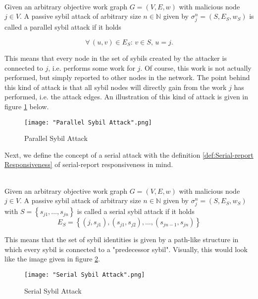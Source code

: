 \begin{definition}\ \\
\label{def:Parallel Sybil Attack}
Given an arbitrary objective work graph $G=(V,E,w)$ with malicious node $j\in{}V$. A passive sybil attack of arbitrary size $n\in\mathbb{N}$ given by $\sigma^n_j=(S,E_S,w_S)$ is called a parallel sybil attack if it holds 

\[
\forall\,(u,v)\in{}E_S:\,v\in{}S,\,u=j .
\]

\noindent{}This means that every node in the set of sybils created by the attacker is connected to $j$, i.e. performs some work for $j$. Of course, this work is not actually performed, but simply reported to other nodes in the network. The point behind this kind of attack is that all sybil nodes will directly gain from the work $j$ has performed, i.e. the attack edges. An illustration of this kind of attack is given in figure \ref{fig:Parallel Sybil Attack} below. \vspace{1em}\\


\begin{figure}[H]
\begin{center}
\texttt{[image: "Parallel Sybil Attack".png]}
\caption{Parallel Sybil Attack}
\label{fig:Parallel Sybil Attack}
\end{center}
\end{figure}

\end{definition}


\noindent{}Next, we define the concept of a serial attack with the definition \ref{def:Serial-report Responsiveness} of serial-report responsiveness in mind. \vspace{1em}\\

\begin{definition}\ \\
\label{def:Serial Sybil Attack}
Given an arbitrary objective work graph $G=(V,E,w)$ with malicious node $j\in{}V$. A passive sybil attack of arbitrary size $n\in\mathbb{N}$ given by $\sigma^n_j=(S,E_S,w_S)$ with $S=\left\lbrace{}s_{j1},\ldots,s_{jn}\right\rbrace$ is called a serial sybil attack if it holds
\[
E_S=\left\lbrace{}(j,s_{j1}), (s_{j1},s_{j2}), \ldots, (s_{jn-1},s_{jn})\right\rbrace
\]

\noindent{}This means that the set of sybil identities is given by a path-like structure in which every sybil is connected to a "predecessor sybil". Visually, this would look like the image given in figure \ref{fig:Serial Sybil Attack}. 

\begin{figure}[H]
\begin{center}
\texttt{[image: "Serial Sybil Attack".png]}
\caption{Serial Sybil Attack}
\label{fig:Serial Sybil Attack}
\end{center}
\end{figure}

\end{definition}

